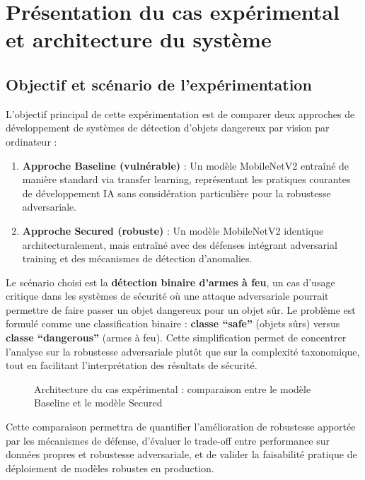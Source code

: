 \section{Présentation du cas expérimental et architecture du système}

\subsection{Objectif et scénario de l'expérimentation}

L'objectif principal de cette expérimentation est de comparer deux approches de développement de systèmes de détection d'objets dangereux par vision par ordinateur :

\begin{enumerate}
    \item \textbf{Approche Baseline (vulnérable)} : Un modèle MobileNetV2 entraîné de manière standard via transfer learning, représentant les pratiques courantes de développement IA sans considération particulière pour la robustesse adversariale.

    \item \textbf{Approche Secured (robuste)} : Un modèle MobileNetV2 identique architecturalement, mais entraîné avec des défenses intégrant adversarial training et des mécanismes de détection d'anomalies.
\end{enumerate}

Le scénario choisi est la \textbf{détection binaire d'armes à feu}, un cas d'usage critique dans les systèmes de sécurité où une attaque adversariale pourrait permettre de faire passer un objet dangereux pour un objet sûr. Le problème est formulé comme une classification binaire : \textbf{classe ``safe''} (objets sûrs) versus \textbf{classe ``dangerous''} (armes à feu). Cette simplification permet de concentrer l'analyse sur la robustesse adversariale plutôt que sur la complexité taxonomique, tout en facilitant l'interprétation des résultats de sécurité.

\begin{figure}[H]
    \centering
    \caption{Architecture du cas expérimental : comparaison entre le modèle Baseline et le modèle Secured}
    \label{fig:architecture_poc}
\end{figure}

Cette comparaison permettra de quantifier l'amélioration de robustesse apportée par les mécanismes de défense, d'évaluer le trade-off entre performance sur données propres et robustesse adversariale, et de valider la faisabilité pratique de déploiement de modèles robustes en production.


